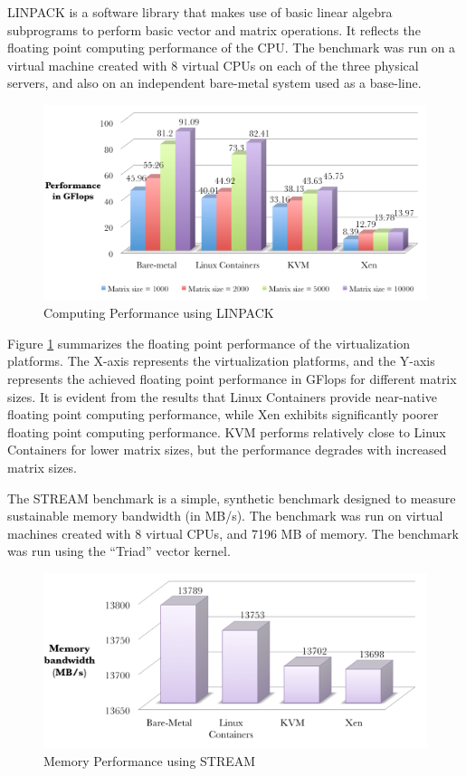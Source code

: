 LINPACK is a software library that makes use of basic linear algebra subprograms to perform basic vector and matrix operations. It reflects the floating point computing performance of the CPU. The benchmark was run on a virtual machine created with 8 virtual CPUs on each of the three physical servers, and also on an independent bare-metal system used as a base-line.

\begin{figure}[H]
\centering
\includegraphics[width=150mm]{linpack.png}
\caption{Computing Performance using LINPACK}
\label{fig:linpack}
\end{figure}


Figure \ref{fig:linpack} summarizes the floating point performance of the virtualization platforms. The X-axis represents the virtualization platforms, and the Y-axis represents the achieved floating point performance in GFlops for different matrix sizes. It is evident from the results that Linux Containers provide near-native floating point computing performance, while Xen exhibits significantly poorer floating point computing performance. KVM performs relatively close to Linux Containers for lower matrix sizes, but the performance degrades with increased matrix sizes.

The STREAM benchmark is a simple, synthetic benchmark designed to measure sustainable memory bandwidth (in MB/s). The benchmark was run on virtual machines created with 8 virtual CPUs, and 7196 MB of memory. The benchmark was run using the ``Triad'' vector kernel.
 
\begin{figure}[H]
\centering
\includegraphics[width=150mm]{stream.png}
\caption{Memory Performance using STREAM}
\label{fig:stream}
\end{figure}

